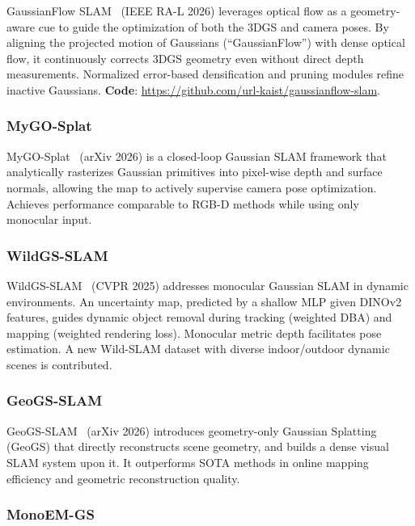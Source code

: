 GaussianFlow SLAM~\cite{seo2026_gaussianflow} (IEEE RA-L 2026) leverages
optical flow as a geometry-aware cue to guide the optimization of both the
3DGS and camera poses.  By aligning the projected motion of Gaussians
(``GaussianFlow'') with dense optical flow, it continuously corrects 3DGS
geometry even without direct depth measurements.  Normalized error-based
densification and pruning modules refine inactive Gaussians.  \textbf{Code}:
\url{https://github.com/url-kaist/gaussianflow-slam}.

\subsubsection{MyGO-Splat}

MyGO-Splat~\cite{zhu2026_mygosplat} (arXiv 2026) is a closed-loop Gaussian
SLAM framework that analytically rasterizes Gaussian primitives into
pixel-wise depth and surface normals, allowing the map to actively supervise
camera pose optimization.  Achieves performance comparable to RGB-D methods
while using only monocular input.

\subsubsection{WildGS-SLAM}

WildGS-SLAM~\cite{zheng2025_wildgssslam} (CVPR 2025) addresses monocular
Gaussian SLAM in dynamic environments.  An uncertainty map, predicted by a
shallow MLP given DINOv2 features, guides dynamic object removal during
tracking (weighted DBA) and mapping (weighted rendering loss).  Monocular
metric depth facilitates pose estimation.  A new Wild-SLAM dataset with
diverse indoor/outdoor dynamic scenes is contributed.

\subsubsection{GeoGS-SLAM}

GeoGS-SLAM~\cite{zhou2026_geogs} (arXiv 2026) introduces geometry-only
Gaussian Splatting (GeoGS) that directly reconstructs scene geometry, and
builds a dense visual SLAM system upon it.  It outperforms SOTA methods in
online mapping efficiency and geometric reconstruction quality.

\subsubsection{MonoEM-GS}

